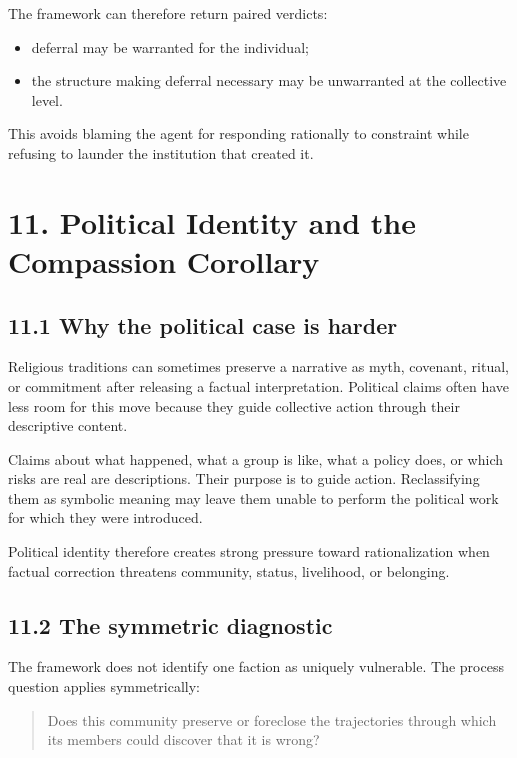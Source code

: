 \documentclass[
  11pt,
]{article}
\providecommand{\tightlist}{%
  \setlength{\itemsep}{0pt}\setlength{\parskip}{0pt}}
\begin{document}
The framework can therefore return paired verdicts:

\begin{itemize}
\tightlist
\item
  deferral may be warranted for the individual;
\item
  the structure making deferral necessary may be unwarranted at the
  collective level.
\end{itemize}

This avoids blaming the agent for responding rationally to constraint
while refusing to launder the institution that created it.

\section{11. Political Identity and the Compassion
Corollary}\label{political-identity-and-the-compassion-corollary}

\subsection{11.1 Why the political case is
harder}\label{why-the-political-case-is-harder}

Religious traditions can sometimes preserve a narrative as myth,
covenant, ritual, or commitment after releasing a factual
interpretation. Political claims often have less room for this move
because they guide collective action through their descriptive content.

Claims about what happened, what a group is like, what a policy does, or
which risks are real are descriptions. Their purpose is to guide action.
Reclassifying them as symbolic meaning may leave them unable to perform
the political work for which they were introduced.

Political identity therefore creates strong pressure toward
rationalization when factual correction threatens community, status,
livelihood, or belonging.

\subsection{11.2 The symmetric
diagnostic}\label{the-symmetric-diagnostic}

The framework does not identify one faction as uniquely vulnerable. The
process question applies symmetrically:

\begin{quote}
Does this community preserve or foreclose the trajectories through which
its members could discover that it is wrong?
\end{quote}
\end{document}
